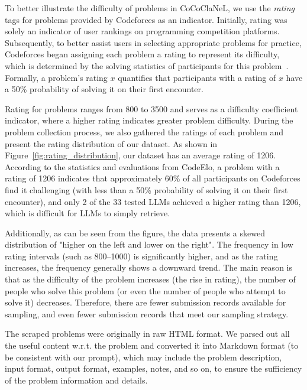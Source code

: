 \documentclass[sigconf]{acmart}
\newcommand{\benchName}{CoCoClaNeL\xspace}
\begin{document}
\label{dataset_details}

To better illustrate the difficulty of problems in \benchName, we use the \emph{rating} tags for problems provided by Codeforces as an indicator. Initially, rating was solely an indicator of user rankings on programming competition platforms. Subsequently, to better assist users in selecting appropriate problems for practice, Codeforces began assigning each problem a rating to represent its difficulty, which is determined by the solving statistics of participants for this problem~\cite{codeforces2019problem}. Formally, a problem's rating $x$ quantifies that participants with a rating of $x$ have a 50\% probability of solving it on their first encounter.

Rating for problems ranges from 800 to 3500 and serves as a difficulty coefficient indicator, where a higher rating indicates greater problem difficulty. During the problem collection process, we also gathered the ratings of each problem and present the rating distribution of our dataset. As shown in Figure~\ref{fig:rating_distribution}, our dataset has an average rating of 1206. According to the statistics and evaluations from CodeElo\cite{quan2025codeelobenchmarkingcompetitionlevelcode}, a problem with a rating of 1206 indicates that approximately 60\% of all participants on Codeforces find it challenging (with less than a 50\% probability of solving it on their first encounter), and only 2 of the 33 tested LLMs achieved a higher rating than 1206, which is difficult for LLMs to simply retrieve. 


Additionally, as can be seen from the figure, the data presents a skewed distribution of "higher on the left and lower on the right". The frequency in low rating intervals (such as 800–1000) is significantly higher, and as the rating increases, the frequency generally shows a downward trend. The main reason is that as the difficulty of the problem increases (the rise in rating), the number of people who solve this problem (or even the number of people who attempt to solve it) decreases. Therefore, there are fewer submission records available for sampling, and even fewer submission records that meet our sampling strategy.

The scraped problems were originally in raw HTML format. We parsed out all the useful content w.r.t. the problem and converted it into Markdown format (to be consistent with our prompt), which may include the problem description, input format, output format, examples, notes, and so on, to ensure the sufficiency of the problem information and details.
\end{document}
